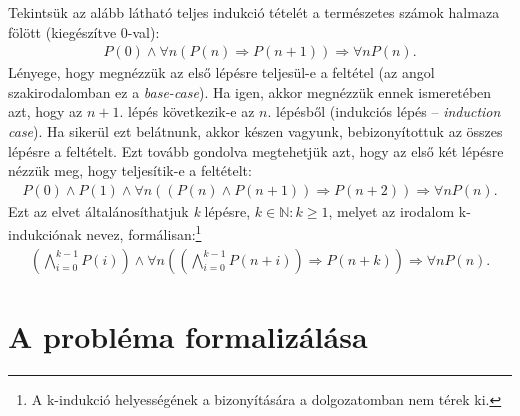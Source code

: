 Tekintsük az alább látható teljes indukció tételét a természetes számok halmaza fölött (kiegészítve 0-val): 
\begin{align}
	P(0) \wedge \forall n (P(n) \Rightarrow P(n+1)) \Rightarrow \forall nP(n).
\end{align}
Lényege, hogy megnézzük az első lépésre teljesül-e a feltétel (az angol szakirodalomban ez a \emph{base-case}). Ha igen, akkor megnézzük ennek ismeretében azt, hogy az $n+1$. lépés következik-e az $n$. lépésből (indukciós lépés -- \emph{induction case}). Ha sikerül ezt belátnunk, akkor készen vagyunk, bebizonyítottuk az összes lépésre a feltételt.
\newline
\newline
Ezt tovább gondolva megtehetjük azt, hogy az első két lépésre nézzük meg, hogy teljesítik-e a feltételt:
\begin{align}
	P(0) \wedge P(1) \wedge \forall n ((P(n) \wedge P(n+1)) \Rightarrow P(n+2) ) \Rightarrow \forall n P(n).
\end{align}
Ezt az elvet általánosíthatjuk \emph{k} lépésre, $k \in \mathbb{N} : k \geq 1$, melyet az irodalom \cite{k_induction_principle} k-indukciónak nevez, formálisan:\footnote{A k-indukció helyességének a bizonyítására a dolgozatomban nem térek ki.}
\begin{align}
	\left( \bigwedge_{i=0}^{k-1} P(i) \right) \wedge \forall n \left( \left( \bigwedge_{i=0}^{k-1} P(n+i) \right) \Rightarrow P(n+k) \right) \Rightarrow \forall n P(n).
\end{align}

\section{A probléma formalizálása}
\label{sec:problema_form}

